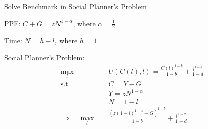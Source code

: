 \documentclass[11pt,aspectratio=169,usenames,dvipsnames]{beamer}
\let\tempone\itemize
\let\temptwo\enditemize
\renewenvironment{itemize}{\tempone\addtolength{\itemsep}{\fill}}{\temptwo}
\begin{document}
\begin{frame}{Solve Benchmark in Social Planner's Problem}
\label{slide:Solve_Benchmark_in_Social_Planner_s_Problem}
    \begin{itemize}
        \item PPF: $ C + G = z N^{1-\alpha} $, where $ \alpha = \frac{1}{2} $
        \item Time: $ N = h - l $, where $ h = 1 $
        \item Social Planner's Problem:
        \begin{equation}
        \label{eq:SPP_Benchmark}
            \begin{split}
                \max_{l} \quad
                    & U( C( l ), l ) = \frac{C( l )^{1-b}}{1-b} + \frac{l^{1-d}}{1-d}
                \\
                \text{s.t.} \quad
                    & C = Y - G
                \\
                    & Y = z N^{1-\alpha}
                \\
                    & N = 1 - l
                \\
                \Rightarrow \quad \max_{l} \quad
                    & \frac{(z ( 1-l )^{1-\alpha} - G)^{1-b}}{1-b} + \frac{l^{1-d}}{1-d}
                \\
            \end{split}
        \end{equation}
    \end{itemize}
\end{frame}
\end{document}

